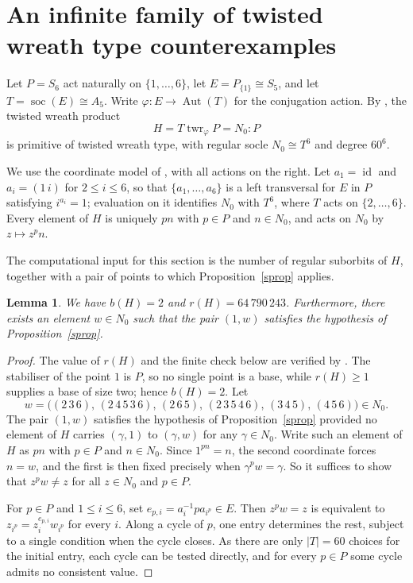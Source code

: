\documentclass[a4paper,reqno,11pt]{amsart}
\newtheorem{lem}[thm]{Lemma}
\numberwithin{equation}{section}
\begin{document}
\section{An infinite family of twisted wreath type counterexamples} \label{sec:tw}

Let $P=S_6$ act naturally on $\{1,\dots,6\}$, let $E=P_{\{1\}}\cong S_5$, and let $T=\operatorname{soc}(E)\cong A_5$. Write $\varphi:E\to\operatorname{Aut}(T)$ for the conjugation action. By \cite[Example~9.3]{F}, the twisted wreath product
\[
H=T\operatorname{twr}_{\varphi}P=N_0{:}P
\]
is primitive of twisted wreath type, with regular socle $N_0\cong T^6$ and degree $60^6$.

We use the coordinate model of \cite[Section~4]{F}, with all actions on the right. Let $a_1=\operatorname{id}$ and $a_i=(1\,i)$ for $2\le i\le6$, so that $\{a_1,\dots,a_6\}$ is a left transversal for $E$ in $P$ satisfying $i^{a_i}=1$; evaluation on it identifies $N_0$ with $T^6$, where $T$ acts on $\{2,\dots,6\}$. Every element of $H$ is uniquely $pn$ with $p\in P$ and $n\in N_0$, and acts on $N_0$ by $z\mapsto z^pn$.

The computational input for this section is the number of regular suborbits of $H$, together with a pair of points to which Proposition~\ref{sprop} applies.

\begin{lem}\label{twinput}
We have $b(H)=2$ and $r(H)=64\,790\,243$. Furthermore, there exists an element $w\in N_0$ such that the pair $(1,w)$ satisfies the hypothesis of Proposition~\ref{sprop}.
\end{lem}

\begin{proof}
The value of $r(H)$ and the finite check below are verified by \cite{AlunaAdam}. The stabiliser of the point $1$ is $P$, so no single point is a base, while $r(H)\ge1$ supplies a base of size two; hence $b(H)=2$. Let
\[
w=\bigl((2\,3\,6),\,(2\,4\,5\,3\,6),\,(2\,6\,5),\,
(2\,3\,5\,4\,6),\,(3\,4\,5),\,(4\,5\,6)\bigr)\in N_0.\]
The pair $(1,w)$ satisfies the hypothesis of Proposition~\ref{sprop} provided no element of $H$ carries $(\gamma,1)$ to $(\gamma,w)$ for any $\gamma\in N_0$. Write such an element of $H$ as $pn$ with $p\in P$ and $n\in N_0$. Since $1^{pn}=n$, the second coordinate forces $n=w$, and the first is then fixed precisely when $\gamma^pw=\gamma$. So it suffices to show that $z^pw\ne z$ for all $z\in N_0$ and $p\in P$.

For $p\in P$ and $1\le i\le6$, set $e_{p,i}=a_i^{-1}pa_{i^p}\in E$. Then $z^pw=z$ is equivalent to $z_{i^p}=z_i^{e_{p,i}}w_{i^p}$ for every $i$. Along a cycle of $p$, one entry determines the rest, subject to a single condition when the cycle closes. As there are only $|T|=60$ choices for the initial entry, each cycle can be tested directly, and for every $p\in P$ some cycle admits no consistent value.
\end{proof}
\end{document}
